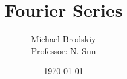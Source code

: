 


\title{Fourier Series}
\date{\today}
\author{Michael Brodskiy\\ \small Professor: N. Sun}



\maketitle

